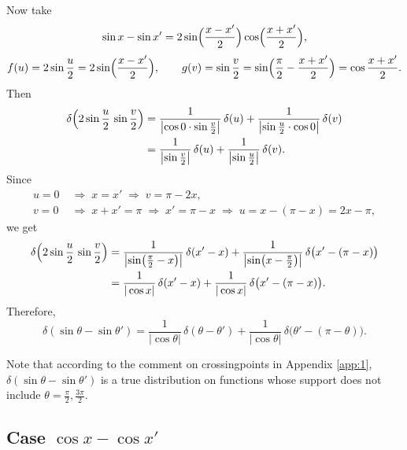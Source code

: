 \documentclass[11pt]{article}
\begin{document}
Now take
\[
  \sin x-\sin x'=2\sin\Bigl(\frac{x-x'}{2}\Bigr)\cos\Bigl(\frac{x+x'}{2}\Bigr),
\]
\[
  f(u)=2\sin\frac{u}{2}=2\sin\Bigl(\frac{x-x'}{2}\Bigr),\qquad
  g(v)=\sin\frac{v}{2}=\sin\Bigl(\frac{\pi}{2}-\frac{x+x'}{2}\Bigr)
  =\cos\frac{x+x'}{2}.
\]
Then
\begin{align*}
  \delta\Bigl(2\sin\frac{u}{2}\,\sin\frac{v}{2}\Bigr)
  &=\frac{1}{\bigl|\cos0\cdot\sin\frac{v}{2}\bigr|}\,\delta(u)
   +\frac{1}{\bigl|\sin\frac{u}{2}\cdot\cos0\bigr|}\,\delta(v)\\
  &=\frac{1}{\bigl|\sin\frac{v}{2}\bigr|}\,\delta(u)
   +\frac{1}{\bigl|\sin\frac{u}{2}\bigr|}\,\delta(v).
\end{align*}
Since
\begin{align*}
  u=0&\;\Rightarrow\; x=x' \;\Rightarrow\; v=\pi-2x,\\
  v=0&\;\Rightarrow\; x+x'=\pi \;\Rightarrow\; x'=\pi-x
     \;\Rightarrow\; u=x-(\pi-x)=2x-\pi,
\end{align*}
we get
\begin{align*}
  \delta\Bigl(2\sin\frac{u}{2}\,\sin\frac{v}{2}\Bigr)
  &=\frac{1}{\bigl|\sin\bigl(\frac{\pi}{2}-x\bigr)\bigr|}\,\delta(x'-x)
   +\frac{1}{\bigl|\sin\bigl(x-\frac{\pi}{2}\bigr)\bigr|}\,\delta\bigl(x'-(\pi-x)\bigr)\\
  &=\frac{1}{|\cos x|}\,\delta(x'-x)+\frac{1}{|\cos x|}\,\delta\bigl(x'-(\pi-x)\bigr).
\end{align*}
Therefore,
\begin{equation}\label{eq:deltasen}
  \delta(\sin\theta-\sin\theta')=\frac{1}{|\cos\theta|}\,\delta(\theta-\theta')
  +\frac{1}{|\cos\theta|}\,\delta\bigl(\theta'-(\pi-\theta)\bigr).
\end{equation}

Note that according to the comment on crossingpoints in Appendix \ref{app:1}, $\delta(\sin\theta-\sin\theta')$ is a true distribution on functions whose support does not include 
$\theta=\frac{\pi}{2}, \frac{3\pi}{2}$.


\subsection{Case $\cos x-\cos x'$}
\end{document}
